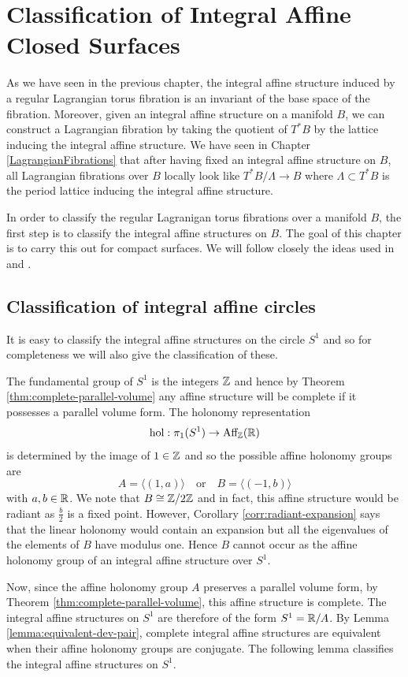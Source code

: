\chapter{Classification of Integral Affine Closed Surfaces}\label{ch:class-IAS}
As we have seen in the previous chapter, the integral affine structure induced
by a regular Lagrangian torus fibration is an invariant of the base space of
the fibration. Moreover, given an integral affine structure on a manifold $B$,
we can construct a Lagrangian fibration by taking the quotient of $T^*B$ by the
lattice inducing the integral affine structure. We have seen in Chapter
\ref{LagrangianFibrations} that after having fixed an integral affine structure
on $B$, all Lagrangian fibrations over $B$ locally look like $T^*B/\Lambda \to
    B$ where $\Lambda \subset T^*B$ is the period lattice inducing the integral
affine structure.

In order to classify the regular Lagranigan torus fibrations over a manifold
$B$, the first step is to classify the integral affine structures on $B$. The
goal of this chapter is to carry this out for compact surfaces. We will follow
closely the ideas used in \cite{Sepe2010} and \cite{MISHACHEV1996301}.

\section{Classification of integral affine circles}
It is easy to classify the integral affine structures on the circle $S^1$ and
so for completeness we will also give the classification of these.

The fundamental group of $S^1$ is the integers $\mathbb{Z}$ and hence by Theorem
\ref{thm:complete-parallel-volume} any affine structure will be complete if it
possesses a parallel volume form. The holonomy representation $$\text{hol} :
    \pi_1(S^1) \to \text{Aff}_{\mathbb{Z}}(\mathbb{R})$$ is determined by the image of $1 \in \mathbb{Z}$ and so the
possible affine holonomy groups are $$ A = \langle (1, a) \rangle \quad
    \text{or} \quad B =\langle(-1, b) \rangle$$ with $a,b \in \mathbb{R}$. We note that $B
    \cong \mathbb{Z}/2\mathbb{Z}$ and in fact, this affine structure would be radiant as
$\frac{b}{2}$ is a fixed point. However, Corollary \ref{corr:radiant-expansion}
says that the linear holonomy would contain an expansion but all the
eigenvalues of the elements of $B$ have modulus one. Hence $B$ cannot occur as
the affine holonomy group of an integral affine structure over $S^1$.

Now, since the affine holonomy group $A$ preserves a parallel volume form, by
Theorem \ref{thm:complete-parallel-volume}, this affine structure is complete.
The integral affine structures on $S^1$ are therefore of the form $S^1 = \mathbb{R} /
    A$. By Lemma \ref{lemma:equivalent-dev-pair}, complete integral affine
structures are equivalent when their affine holonomy groups are conjugate. The
following lemma classifies the integral affine structures on $S^1$.

